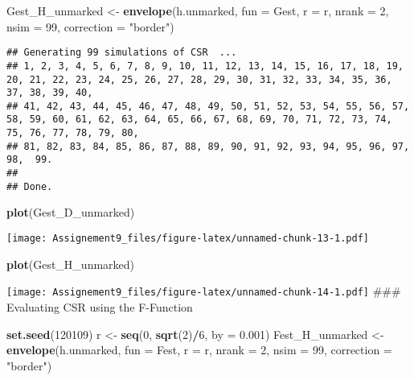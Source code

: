 \documentclass[]{article}
\newenvironment{Shaded}{\begin{snugshade}}{\end{snugshade}}
\newcommand{\DataTypeTok}[1]{\textcolor[rgb]{0.13,0.29,0.53}{#1}}
\newcommand{\DecValTok}[1]{\textcolor[rgb]{0.00,0.00,0.81}{#1}}
\newcommand{\FloatTok}[1]{\textcolor[rgb]{0.00,0.00,0.81}{#1}}
\newcommand{\KeywordTok}[1]{\textcolor[rgb]{0.13,0.29,0.53}{\textbf{#1}}}
\newcommand{\NormalTok}[1]{#1}
\newcommand{\OperatorTok}[1]{\textcolor[rgb]{0.81,0.36,0.00}{\textbf{#1}}}
\newcommand{\StringTok}[1]{\textcolor[rgb]{0.31,0.60,0.02}{#1}}
\begin{document}
\begin{Shaded}
\begin{Highlighting}[]
\NormalTok{Gest_H_unmarked <-}\StringTok{ }\KeywordTok{envelope}\NormalTok{(h.unmarked, }\DataTypeTok{fun =}\NormalTok{ Gest, }\DataTypeTok{r =}\NormalTok{ r, }\DataTypeTok{nrank =} \DecValTok{2}\NormalTok{, }\DataTypeTok{nsim =} \DecValTok{99}\NormalTok{, }\DataTypeTok{correction =} \StringTok{"border"}\NormalTok{)}
\end{Highlighting}
\end{Shaded}

\begin{verbatim}
## Generating 99 simulations of CSR  ...
## 1, 2, 3, 4, 5, 6, 7, 8, 9, 10, 11, 12, 13, 14, 15, 16, 17, 18, 19, 20, 21, 22, 23, 24, 25, 26, 27, 28, 29, 30, 31, 32, 33, 34, 35, 36, 37, 38, 39, 40,
## 41, 42, 43, 44, 45, 46, 47, 48, 49, 50, 51, 52, 53, 54, 55, 56, 57, 58, 59, 60, 61, 62, 63, 64, 65, 66, 67, 68, 69, 70, 71, 72, 73, 74, 75, 76, 77, 78, 79, 80,
## 81, 82, 83, 84, 85, 86, 87, 88, 89, 90, 91, 92, 93, 94, 95, 96, 97, 98,  99.
## 
## Done.
\end{verbatim}

\begin{Shaded}
\begin{Highlighting}[]
\KeywordTok{plot}\NormalTok{(Gest_D_unmarked)}
\end{Highlighting}
\end{Shaded}

\texttt{[image: Assignement9\_files/figure-latex/unnamed-chunk-13-1.pdf]}

\begin{Shaded}
\begin{Highlighting}[]
\KeywordTok{plot}\NormalTok{(Gest_H_unmarked)}
\end{Highlighting}
\end{Shaded}

\texttt{[image: Assignement9\_files/figure-latex/unnamed-chunk-14-1.pdf]}
\#\#\# Evaluating CSR using the F-Function

\begin{Shaded}
\begin{Highlighting}[]
\KeywordTok{set.seed}\NormalTok{(}\DecValTok{120109}\NormalTok{)}
\NormalTok{r <-}\StringTok{ }\KeywordTok{seq}\NormalTok{(}\DecValTok{0}\NormalTok{, }\KeywordTok{sqrt}\NormalTok{(}\DecValTok{2}\NormalTok{)}\OperatorTok{/}\DecValTok{6}\NormalTok{, }\DataTypeTok{by =} \FloatTok{0.001}\NormalTok{)}
\NormalTok{Fest_H_unmarked <-}\StringTok{ }\KeywordTok{envelope}\NormalTok{(h.unmarked, }\DataTypeTok{fun =}\NormalTok{ Fest, }\DataTypeTok{r =}\NormalTok{ r, }\DataTypeTok{nrank =} \DecValTok{2}\NormalTok{, }\DataTypeTok{nsim =} \DecValTok{99}\NormalTok{, }\DataTypeTok{correction =} \StringTok{"border"}\NormalTok{)}
\end{Highlighting}
\end{Shaded}
\end{document}
